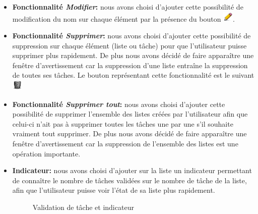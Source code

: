 \documentclass[a4paper,10pt]{article}
\begin{document}
\begin{itemize}
\item \textbf{Fonctionnalité \textit{Modifier}:} nous avons choisi d'ajouter cette possibilité de modification du nom sur chaque élément par la présence du bouton \includegraphics[width=0.5cm]{Images/modify.png}.
\item \textbf{Fonctionnalité \textit{Supprimer}:} nous avons choisi d'ajouter cette possibilité de suppression sur chaque élément (liste ou tâche) pour que l'utilisateur puisse supprimer plus rapidement. De  plus nous avons décidé de faire apparaître une fenêtre d'avertissement car la suppression d'une liste entraîne la suppression de toutes ses tâches. Le bouton représentant cette fonctionnalité est le suivant \includegraphics[width=0.5cm]{Images/trash_empty.png}
\item \textbf{Fonctionnalité \textit{Supprimer tout}:} nous avons choisi d'ajouter cette possibilité de supprimer l'ensemble des listes créées par l'utilisateur afin que celui-ci n'ait pas à supprimer toutes les tâches une par une s'il souhaite vraiment tout supprimer. De  plus nous avons décidé de faire apparaître une fenêtre d'avertissement car la suppression de l'ensemble des listes est une opération importante.
\item \textbf{Indicateur:} nous avons choisi d'ajouter sur la liste un indicateur permettant de connaître le nombre de tâches validées sur le nombre de tâche de la liste, afin que l'utilisateur puisse voir l'état de sa liste plus rapidement.
\begin{figure}[H]
    \center
     \quad
    \caption{Validation de tâche et indicateur}
\end{figure}
\end{itemize}
\end{document}

